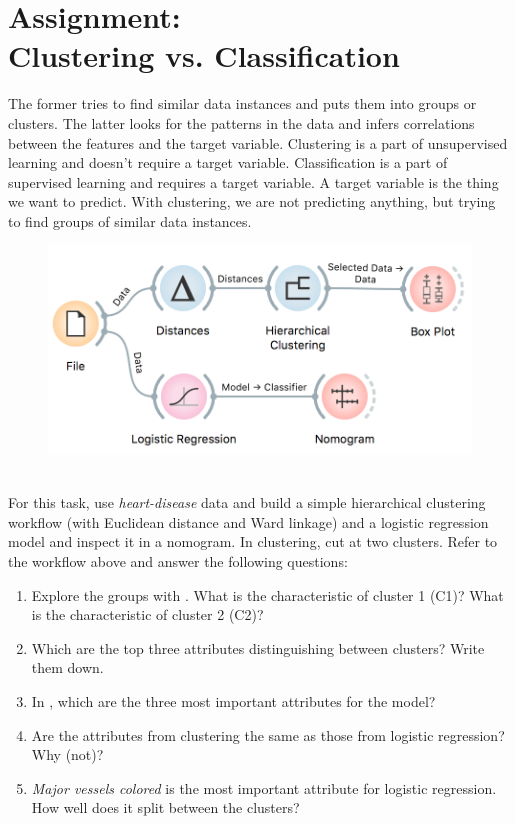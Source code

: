 \chapter{Assignment: \protect\\ Clustering vs. Classification}
\label{hw:clustering-classification}

 The former tries to find similar data instances and puts them into groups or clusters. The latter looks for the patterns in the data and infers correlations between the features and the target variable. Clustering is a part of unsupervised learning and doesn't require a target variable. Classification is a part of supervised learning and requires a target variable. A target variable is the thing we want to predict. With clustering, we are not predicting anything, but trying to find groups of similar data instances.

\begin{figure}[h]
  \centering
  \includegraphics[scale=0.7]{workflow.png}%
  \caption{$\;$}
  \label{fig:wf1}
\end{figure}

For this task, use \textit{heart-disease} data and build a simple hierarchical clustering workflow (with Euclidean distance and Ward linkage) and a logistic regression model and inspect it in a nomogram. In clustering, cut at two clusters. Refer to the workflow above and answer the following questions:

\begin{enumerate}
    \item Explore the groups with . What is the characteristic of cluster 1 (C1)? What is the characteristic of cluster 2 (C2)?
    \item Which are the top three attributes distinguishing between clusters? Write them down.
    \item In , which are the three most important attributes for the model?
    \item Are the attributes from clustering the same as those from logistic regression? Why (not)?
    \item \textit{Major vessels colored} is the most important attribute for logistic regression. How well does it split between the clusters?
\end{enumerate}
